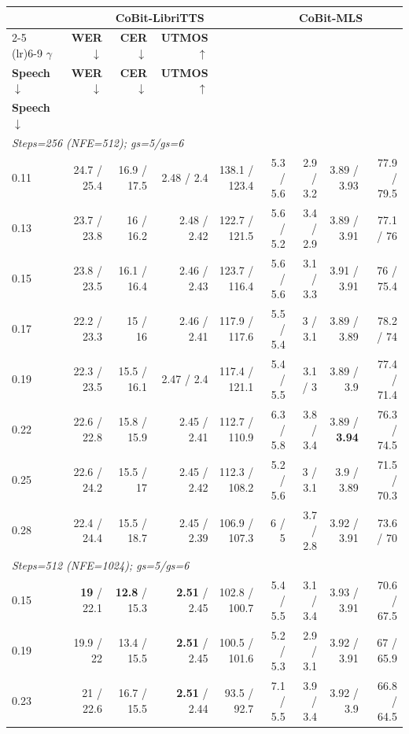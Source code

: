 \begin{table}[t]
\centering
\footnotesize
\setlength{\tabcolsep}{4pt}
\begin{tabular}{l rrrrrrrr}
\toprule
 & \multicolumn{4}{c}{\textbf{CoBit-LibriTTS}} & \multicolumn{4}{c}{\textbf{CoBit-MLS}} \\
\cmidrule(lr){2-5} \cmidrule(lr){6-9}
$\gamma$ & \textbf{WER}$\downarrow$ & \textbf{CER}$\downarrow$ & \textbf{UTMOS}$\uparrow$ & \makecell{\textbf{GenPPL-} \\ \textbf{Speech}$\downarrow$} & \textbf{WER}$\downarrow$ & \textbf{CER}$\downarrow$ & \textbf{UTMOS}$\uparrow$ & \makecell{\textbf{GenPPL-} \\ \textbf{Speech}$\downarrow$} \\
\midrule
\multicolumn{7}{l}{\emph{Steps=256 (NFE=512); gs=5/gs=6}} \\
0.11 & 24.7 / 25.4 & 16.9 / 17.5 & 2.48 / 2.4 & 138.1 / 123.4 & 5.3 / 5.6 & 2.9 / 3.2 & 3.89 / 3.93 & 77.9 / 79.5 \\
0.13 & 23.7 / 23.8 & 16 / 16.2 & 2.48 / 2.42 & 122.7 / 121.5 & 5.6 / 5.2 & 3.4 / 2.9 & 3.89 / 3.91 & 77.1 / 76 \\
0.15 & 23.8 / 23.5 & 16.1 / 16.4 & 2.46 / 2.43 & 123.7 / 116.4 & 5.6 / 5.6 & 3.1 / 3.3 & 3.91 / 3.91 & 76 / 75.4 \\
0.17 & 22.2 / 23.3 & 15 / 16 & 2.46 / 2.41 & 117.9 / 117.6 & 5.5 / 5.4 & 3 / 3.1 & 3.89 / 3.89 & 78.2 / 74 \\
0.19 & 22.3 / 23.5 & 15.5 / 16.1 & 2.47 / 2.4 & 117.4 / 121.1 & 5.4 / 5.5 & 3.1 / 3 & 3.89 / 3.9 & 77.4 / 71.4 \\
0.22 & 22.6 / 22.8 & 15.8 / 15.9 & 2.45 / 2.41 & 112.7 / 110.9 & 6.3 / 5.8 & 3.8 / 3.4 & 3.89 / \textbf{3.94} & 76.3 / 74.5 \\
0.25 & 22.6 / 24.2 & 15.5 / 17 & 2.45 / 2.42 & 112.3 / 108.2 & 5.2 / 5.6 & 3 / 3.1 & 3.9 / 3.89 & 71.5 / 70.3 \\
0.28 & 22.4 / 24.4 & 15.5 / 18.7 & 2.45 / 2.39 & 106.9 / 107.3 & 6 / 5 & 3.7 / 2.8 & 3.92 / 3.91 & 73.6 / 70 \\
\midrule
\multicolumn{7}{l}{\emph{Steps=512 (NFE=1024); gs=5/gs=6}} \\
0.15 & \textbf{19} / 22.1 & \textbf{12.8} / 15.3 & \textbf{2.51} / 2.45 & 102.8 / 100.7 & 5.4 / 5.5 & 3.1 / 3.4 & 3.93 / 3.91 & 70.6 / 67.5 \\
0.19 & 19.9 / 22 & 13.4 / 15.5 & \textbf{2.51} / 2.45 & 100.5 / 101.6 & 5.2 / 5.3 & 2.9 / 3.1 & 3.92 / 3.91 & 67 / 65.9 \\
0.23 & 21 / 22.6 & 16.7 / 15.5 & \textbf{2.51} / 2.44 & 93.5 / 92.7 & 7.1 / 5.5 & 3.9 / 3.4 & 3.92 / 3.9 & 66.8 / 64.5 \\

\end{tabular}
\end{table}
